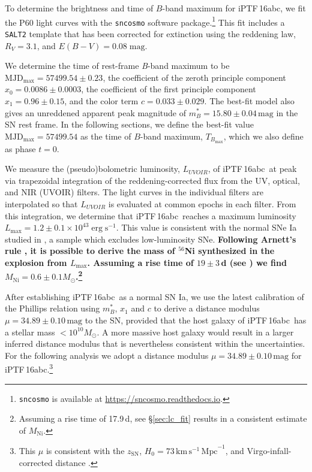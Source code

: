 \documentclass[twocolumn]{aastex61}
\newcommand{\sm}{M_\odot}
\newcommand{\abc}{iPTF\,16abc}
\begin{document}
To determine the brightness and time of $B$-band maximum for 
\abc, we fit the P60 light curves with the \texttt{sncosmo} software package.\footnote{\texttt{sncosmo} is available at
  \url{https://sncosmo.readthedocs.io}.} This fit includes a \texttt{SALT2} template \citep{2007A&A...466...11G} that has been corrected for extinction using the \citet{1999PASP..111...63F} reddening law, $R_V=3.1$, and $E(B-V) = 0.08 \; \mathrm{mag}$.

We determine the time of rest-frame \textit{B}-band maximum to be
$\textrm{MJD}_\mathrm{max}=57499.54\pm0.23$, the coefficient of the zeroth
principle component $x_0 = 0.0086 \pm 0.0003$, the coefficient of the first
principle component $x_1 = 0.96 \pm 0.15$, and the color term $c = 0.033 \pm
0.029$. The best-fit model also gives an unreddened apparent peak magnitude of
$m^*_{B}=15.80 \pm 0.04 \,\textrm{mag}$ in the SN rest frame. In the following
sections, we define the best-fit value $\textrm{MJD}_\mathrm{max}=57499.54$ as
the time of $B$-band maximum, $T_{B_\mathrm{max}}$, which we also define as
phase $t=0$.

We measure the (pseudo)bolometric luminosity, $L_{UVOIR}$, of \abc\ at peak
via trapezoidal integration of the reddening-corrected flux from the UV,
optical, and NIR (UVOIR) filters. The light curves in the individual filters
are interpolated so that $L_{UVOIR}$ is evaluated at common epochs in each
filter. From this integration, we determine that \abc\ reaches a maximum
luminosity $L_\mathrm{max} = 1.2 \pm 0.1 \times 10^{43} \; \mathrm{erg \;
s}^{-1}$. This value is consistent with the normal SNe Ia studied in
\citet{2016A&A...588A..84D}, a sample which excludes low-luminosity SNe.
\textbf{Following Arnett's rule \citet{1982ApJ...253..785A,
1985Natur.314..337A}, it is possible to derive the mass of $^{56}$Ni
synthesized in the explosion from $L_\mathrm{max}$. Assuming a rise time of
$19 \pm 3$\,d (see \citealt{2006A&A...450..241S}) we find $M_\mathrm{Ni} = 0.6
\pm 0.1 M_\odot$.\footnote{Assuming a rise time of 17.9\,d, see
\S\ref{sec:lc_fit} results in a consistent estimate of $M_\mathrm{Ni}$.}}

After establishing \abc\ as a normal SN Ia, we use the latest calibration
\citep{2014A&A...568A..22B} of the Phillips relation
\citep{1993ApJ...413L.105P} using $m^*_{B}$, $x_1$ and $c$ to derive a
distance modulus $\mu = 34.89 \pm 0.10 \,\textrm{mag}$ to the SN, provided
that the host galaxy of \abc\ has a stellar mass $< 10^{10}\sm$. A more
massive host galaxy would result in a larger inferred distance modulus that is
nevertheless consistent within the uncertainties. For the following analysis
we adopt a distance modulus $\mu = 34.89 \pm 0.10 \,\textrm{mag}$ for
\abc.\footnote{This $\mu$ is consistent with the $z_\mathrm{SN}$, $H_0 = 73 \,
\mathrm{km \, s^{-1} \, Mpc}^{-1}$, and Virgo-infall-corrected distance
\citep{2000ApJ...529..786M}.}
\end{document}
